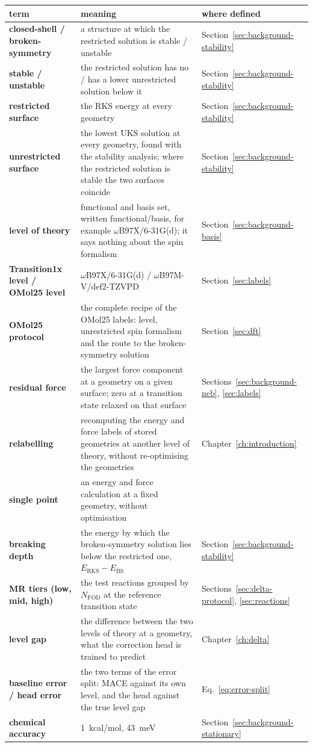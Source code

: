 \noindent
{\renewcommand{\arraystretch}{1.3}
\begin{tabular}{@{}p{3.4cm}p{\dimexpr\linewidth-3.4cm-2.6cm-4\tabcolsep\relax}p{2.6cm}@{}}
\toprule
  term & meaning & where defined \tabularnewline
\midrule
  \textbf{closed-shell / broken-symmetry} & \raggedright a structure at which the restricted solution is stable / unstable & Section~\ref{sec:background-stability} \tabularnewline
  \textbf{stable / unstable} & \raggedright the restricted solution has no / has a lower unrestricted solution below it & Section~\ref{sec:background-stability} \tabularnewline
  \textbf{restricted surface} & \raggedright the RKS energy at every geometry & Section~\ref{sec:background-stability} \tabularnewline
  \textbf{unrestricted surface} & \raggedright the lowest UKS solution at every geometry, found with the stability analysis; where the restricted solution is stable the two surfaces coincide & Section~\ref{sec:background-stability} \tabularnewline
  \textbf{level of theory} & \raggedright functional and basis set, written functional/basis, for example \mbox{$\omega$B97X/6-31G(d)}; it says nothing about the spin formalism & Section~\ref{sec:background-basis} \tabularnewline
  \textbf{Transition1x level / OMol25 level} & \raggedright \mbox{$\omega$B97X/6-31G(d)} / \mbox{$\omega$B97M-V/def2-TZVPD} & Section~\ref{sec:labels} \tabularnewline
  \textbf{OMol25 protocol} & \raggedright the complete recipe of the OMol25 labels: level, unrestricted spin formalism and the route to the broken-symmetry solution & Section~\ref{sec:dft} \tabularnewline
  \textbf{residual force} & \raggedright the largest force component at a geometry on a given surface; zero at a transition state relaxed on that surface & Sections~\ref{sec:background-neb}, \ref{sec:labels} \tabularnewline
  \textbf{relabelling} & \raggedright recomputing the energy and force labels of stored geometries at another level of theory, without re-optimising the geometries & Chapter~\ref{ch:introduction} \tabularnewline
  \textbf{single point} & \raggedright an energy and force calculation at a fixed geometry, without optimisation &  \tabularnewline
  \textbf{breaking depth} & \raggedright the energy by which the broken-symmetry solution lies below the restricted one, $E_\mathrm{RKS} - E_\mathrm{BS}$ & Section~\ref{sec:background-stability} \tabularnewline
  \textbf{MR tiers (low, mid, high)} & \raggedright the test reactions grouped by $N_\mathrm{FOD}$ at the reference transition state & Sections~\ref{sec:delta-protocol}, \ref{sec:reactions} \tabularnewline
  \textbf{level gap} & \raggedright the difference between the two levels of theory at a geometry, what the correction head is trained to predict & Chapter~\ref{ch:delta} \tabularnewline
  \textbf{baseline error / head error} & \raggedright the two terms of the error split: MACE against its own level, and the head against the true level gap & Eq.~\eqref{eq:error-split} \tabularnewline
  \textbf{chemical accuracy} & \raggedright 1~kcal/mol, 43~meV & Section~\ref{sec:background-stationary} \tabularnewline
\bottomrule
\end{tabular}}

